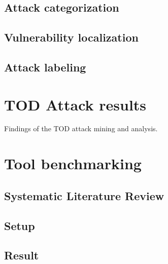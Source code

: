 \documentclass[draft,final]{vutinfth} %
\begin{document}
\section{Attack categorization}

\section{Vulnerability localization}

\section{Attack labeling}

\chapter{TOD Attack results}

Findings of the TOD attack mining and analysis.

\chapter{Tool benchmarking}

\section{Systematic Literature Review}

\section{Setup}

\section{Result}





\backmatter

\listoffigures %

\cleardoublepage %
\listoftables %

\listofalgorithms
{}

\printindex

\printglossaries



\end{document}
